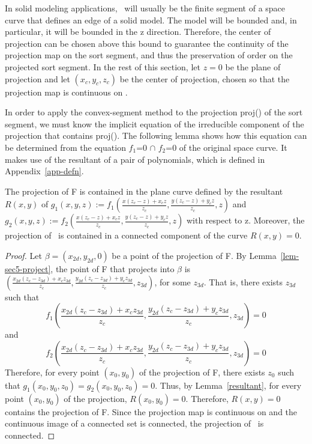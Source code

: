 In solid modeling applications, \ will usually be the finite
segment of a space curve that defines an edge of a solid model.
The model will be bounded and, in particular, it will be bounded in the z 
direction.
Therefore, the 
center of projection can be chosen above this bound to guarantee
the continuity of the projection map on the sort segment, and thus
the preservation of order on the projected sort segment.
In the rest of this section, let $z=0$ be the plane of projection and
let $(x_{c},y_{c},z_{c})$ be the center of projection, chosen so that the
projection map is continuous on .

In order to apply the convex-segment 
method to the projection proj() of the
sort segment, we must know the implicit equation 
of the irreducible 
component of the projection that contains proj().
The following lemma shows how this equation 
can be determined from the equation $f_{1}$=0 $\cap$ $f_{2}$=0
of the original space curve.  
It makes use of the resultant of a pair of polynomials, which is defined
in Appendix~\ref{app-defn}.
%
\begin{lemma}
\label{lem-sec5-planeeqn}
The projection of F is contained in the plane curve defined by
the resultant $R(x,y)$ of 
\( g_{1}(x,y,z) := f_{1}(\frac{x(z_{c}-z)+x_{c}z}{z_{c}},
                              \frac{y(z_{c}-z)+y_{c}z}{z_{c}},
                              z) \) and
\( g_{2}(x,y,z) := f_{2}(\frac{x(z_{c}-z)+x_{c}z}{z_{c}},
                              \frac{y(z_{c}-z)+y_{c}z}{z_{c}},
                              z) \) with respect to z.
Moreover, the projection of \ is contained in a 
connected component of the curve $R(x,y) = 0$.
\end{lemma}
%
\begin{proof}
Let $\beta = (x_{2d},y_{2d},0)$ be a point of the projection of F.
By Lemma~\ref{lem-sec5-project}, the point of F that projects into 
$\beta$ is 
$(\frac{x_{2d}(z_{c}-z_{3d})+x_{c}z_{3d}}{z_{c}},
                              \frac{y_{2d}(z_{c}-z_{3d})+y_{c}z_{3d}}{z_{c}},
                              z_{3d})$, for some $z_{3d}$.
That is, there exists $z_{3d}$ such that
\[ f_{1}(\frac{x_{2d}(z_{c}-z_{3d})+x_{c}z_{3d}}{z_{c}},
                              \frac{y_{2d}(z_{c}-z_{3d})+y_{c}z_{3d}}{z_{c}},
                              z_{3d}) = 0 \]
and
\[ f_{2}(\frac{x_{2d}(z_{c}-z_{3d})+x_{c}z_{3d}}{z_{c}},
                              \frac{y_{2d}(z_{c}-z_{3d})+y_{c}z_{3d}}{z_{c}},
                              z_{3d}) = 0 \]
Therefore, for every point \mbox{$(x_{0},y_{0})$} of the projection of F,
there exists $z_{0}$ 
such that \mbox{$g_{1}(x_{0},y_{0},z_{0}) = g_{2}(x_{0},y_{0},z_{0}) = 0$}.
Thus, by Lemma~\ref{resultant}, for every point \mbox{$(x_{0},y_{0})$} of the 
projection, \mbox{$R(x_{0},y_{0}) = 0$}.
Therefore, \mbox{$R(x,y)=0$} contains the projection of F.
Since the projection map is continuous on  and the continuous
image of a connected set is 
connected,
the projection of \ is connected.
\end{proof}

